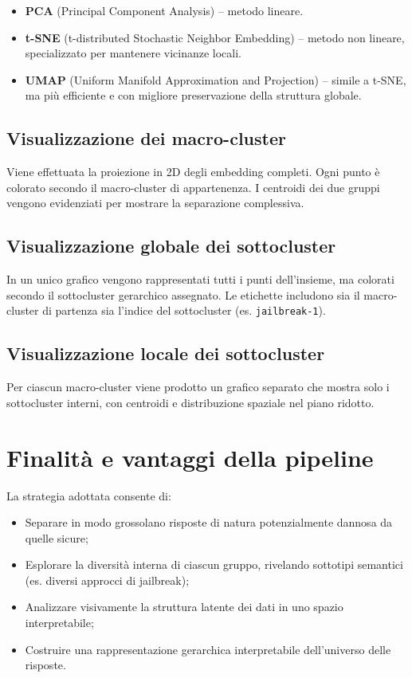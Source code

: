 \documentclass[a4paper,11pt]{article}
\begin{document}
\begin{itemize}
    \item \textbf{PCA} (Principal Component Analysis) – metodo lineare.
    \item \textbf{t-SNE} (t-distributed Stochastic Neighbor Embedding) – metodo non lineare, specializzato per mantenere vicinanze locali.
    \item \textbf{UMAP} (Uniform Manifold Approximation and Projection) – simile a t-SNE, ma più efficiente e con migliore preservazione della struttura globale.
\end{itemize}

\subsection{Visualizzazione dei macro-cluster}

Viene effettuata la proiezione in 2D degli embedding completi. Ogni punto è colorato secondo il macro-cluster di appartenenza. I centroidi dei due gruppi vengono evidenziati per mostrare la separazione complessiva.

\subsection{Visualizzazione globale dei sottocluster}

In un unico grafico vengono rappresentati tutti i punti dell’insieme, ma colorati secondo il sottocluster gerarchico assegnato. Le etichette includono sia il macro-cluster di partenza sia l’indice del sottocluster (es. \texttt{jailbreak-1}).

\subsection{Visualizzazione locale dei sottocluster}

Per ciascun macro-cluster viene prodotto un grafico separato che mostra solo i sottocluster interni, con centroidi e distribuzione spaziale nel piano ridotto.

\section{Finalità e vantaggi della pipeline}

La strategia adottata consente di:
\begin{itemize}
    \item Separare in modo grossolano risposte di natura potenzialmente dannosa da quelle sicure;
    \item Esplorare la diversità interna di ciascun gruppo, rivelando sottotipi semantici (es. diversi approcci di jailbreak);
    \item Analizzare visivamente la struttura latente dei dati in uno spazio interpretabile;
    \item Costruire una rappresentazione gerarchica interpretabile dell’universo delle risposte.
\end{itemize}
\end{document}
